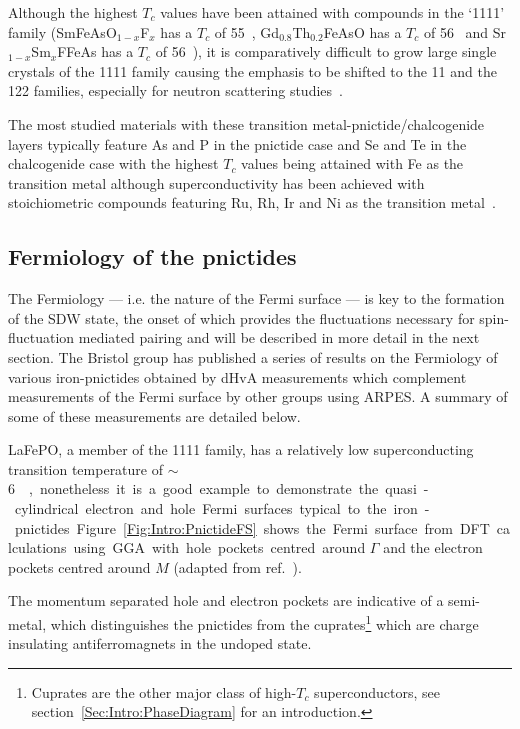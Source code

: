 Although the highest $T_c$ values have been attained with compounds in the `1111' family (SmFeAsO$_{1-x}$F$_x$ has a $T_c$ of \unit{55}{\kelvin}~\cite{Ren2008}, Gd$_{0.8}$Th$_{0.2}$FeAsO has a $T_c$ of \unit{56}{\kelvin}~\cite{Wang2008} and Sr$_{1-x}$Sm$_x$FFeAs has a $T_c$ of \unit{56}{\kelvin}~\cite{Wu2009}), it is comparatively difficult to grow large single crystals of the 1111 family causing the emphasis to be shifted to the 11 and the 122 families, especially for neutron scattering studies~\cite{Johnston2010}.

The most studied materials with these transition metal-pnictide/chalcogenide layers typically feature As and P in the pnictide case and Se and Te in the chalcogenide case with the highest $T_c$ values being attained with Fe as the transition metal although superconductivity has been achieved with stoichiometric compounds featuring Ru, Rh, Ir and Ni as the transition metal~\cite{Johnston2010}.



\subsection{Fermiology of the pnictides}

The Fermiology --- i.e. the nature of the Fermi surface --- is key to the formation of the \ac{SDW} state, the onset of which provides the fluctuations necessary for spin-fluctuation mediated pairing and will be described in more detail in the next section. The Bristol group has published a series of results on the Fermiology of various iron-pnictides obtained by \acf{dHvA} measurements which complement measurements of the Fermi surface by other groups using \acf{ARPES}. A summary of some of these measurements are detailed below.

LaFePO, a member of the 1111 family, has a relatively low superconducting transition temperature of \unit{$\sim$6}{\kelvin}, nonetheless it is a good example to demonstrate the quasi-cylindrical electron and hole Fermi surfaces typical to the iron-pnictides. Figure~\ref{Fig:Intro:PnictideFS} shows the Fermi surface from \acf{DFT} calculations using \ac{GGA} with hole pockets centred around $\Gamma$ and the electron pockets centred around $M$ (adapted from ref.~\cite{Carrington2009}).

The momentum separated hole and electron pockets are indicative of a semi-metal, which distinguishes the pnictides from the cuprates\footnote{Cuprates are the other major class of high-$T_c$ superconductors, see section~\ref{Sec:Intro:PhaseDiagram} for an introduction.} which are charge insulating antiferromagnets in the undoped state. 

